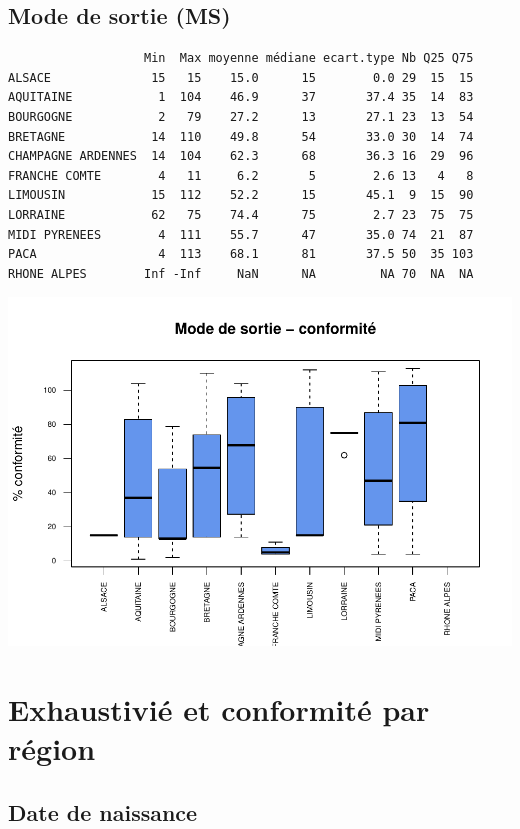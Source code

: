 \documentclass[]{article}
\begin{document}
\subsection{Mode de sortie (MS)}\label{mode-de-sortie-ms-1}

\begin{verbatim}
                   Min  Max moyenne médiane ecart.type Nb Q25 Q75
ALSACE              15   15    15.0      15        0.0 29  15  15
AQUITAINE            1  104    46.9      37       37.4 35  14  83
BOURGOGNE            2   79    27.2      13       27.1 23  13  54
BRETAGNE            14  110    49.8      54       33.0 30  14  74
CHAMPAGNE ARDENNES  14  104    62.3      68       36.3 16  29  96
FRANCHE COMTE        4   11     6.2       5        2.6 13   4   8
LIMOUSIN            15  112    52.2      15       45.1  9  15  90
LORRAINE            62   75    74.4      75        2.7 23  75  75
MIDI PYRENEES        4  111    55.7      47       35.0 74  21  87
PACA                 4  113    68.1      81       37.5 50  35 103
RHONE ALPES        Inf -Inf     NaN      NA         NA 70  NA  NA
\end{verbatim}

\includegraphics{septembre2015_files/figure-latex/unnamed-chunk-34-1.pdf}

\section{Exhaustivié et conformité par
région}\label{exhaustivie-et-conformite-par-region}

\subsection{Date de naissance}\label{date-de-naissance-2}
\end{document}
